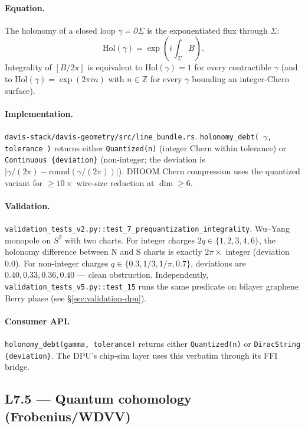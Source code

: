 \documentclass[11pt,letterpaper]{article}
\begin{document}
\paragraph{Equation.}
The holonomy of a closed loop $\gamma = \partial \Sigma$ is the
exponentiated flux through $\Sigma$:
\[
\mathrm{Hol}(\gamma) = \exp\!\left( i \int_\Sigma B \right).
\]
Integrality of $[B / 2\pi]$ is equivalent to
$\mathrm{Hol}(\gamma) = 1$ for every contractible $\gamma$ (and to
$\mathrm{Hol}(\gamma) = \exp(2\pi i n)$ with $n \in \mathbb{Z}$ for
every $\gamma$ bounding an integer-Chern surface).

\paragraph{Implementation.}
\texttt{davis-stack/davis-geometry/src/line\_bundle.rs}.
\texttt{holonomy\_debt(\,$\gamma$, tolerance\,)} returns either
\verb|Quantized(n)| (integer Chern within tolerance) or
\verb|Continuous {deviation}| (non-integer; the deviation is
$|\gamma/(2\pi) - \mathrm{round}(\gamma/(2\pi))|$). DHOOM Chern
compression uses the quantized variant for $\geq 10\times$
wire-size reduction at $\dim \geq 6$.

\paragraph{Validation.}
\texttt{validation\_tests\_v2.py::test\_7\_prequantization\_integrality}.
Wu--Yang monopole on $S^2$ with two charts. For integer charges
$2q \in \{1, 2, 3, 4, 6\}$, the holonomy difference between N and S
charts is exactly $2\pi \times$ integer (deviation $0.0$). For
non-integer charges $q \in \{0.3, 1/3, 1/\pi, 0.7\}$, deviations
are $0.40, 0.33, 0.36, 0.40$ --- clean obstruction.
Independently, \texttt{validation\_tests\_v5.py::test\_15} runs the
same predicate on bilayer graphene Berry phase (see
\S\ref{sec:validation-dpu}).

\paragraph{Consumer API.}
\texttt{holonomy\_debt(gamma, tolerance)} returns either
\texttt{Quantized(n)} or \texttt{DiracString \{deviation\}}.
The DPU's chip-sim layer uses this verbatim through its FFI bridge.


\subsection{L7.5 --- Quantum cohomology (Frobenius/WDVV)}
\end{document}
